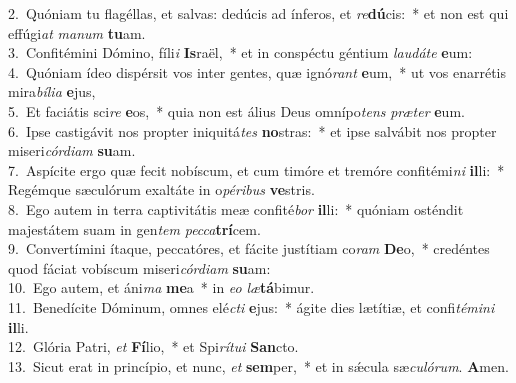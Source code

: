 {2.~}Quóniam tu flagéllas, et salvas: dedúcis ad ínferos, et \textit{re}\textbf{dú}cis:~* et non est qui effúgi\textit{at} \textit{ma}\textit{num} \textbf{tu}am.\\
{3.~}Confitémini Dómino, fíli\textit{i} \textbf{Is}raël,~* et in conspéctu géntium \textit{lau}\textit{dá}\textit{te} \textbf{e}um:\\
{4.~}Quóniam ídeo dispérsit vos inter gentes, quæ ignó\textit{rant} \textbf{e}um,~* ut vos enarrétis mira\textit{bí}\textit{li}\textit{a} \textbf{e}jus,\\
{5.~}Et faciátis sci\textit{re} \textbf{e}os,~* quia non est álius Deus omnípo\textit{tens} \textit{præ}\textit{ter} \textbf{e}um.\\
{6.~}Ipse castigávit nos propter iniquitá\textit{tes} \textbf{no}stras:~* et ipse salvábit nos propter miseri\textit{cór}\textit{di}\textit{am} \textbf{su}am.\\
{7.~}Aspícite ergo quæ fecit nobíscum, et cum timóre et tremóre confitémi\textit{ni} \textbf{il}li:~* Regémque sæculórum exaltáte in o\textit{pé}\textit{ri}\textit{bus} \textbf{ve}stris.\\
{8.~}Ego autem in terra captivitátis meæ confité\textit{bor} \textbf{il}li:~* quóniam osténdit majestátem suam in gen\textit{tem} \textit{pec}\textit{ca}\textbf{trí}cem.\\
{9.~}Convertímini ítaque, peccatóres, et fácite justítiam co\textit{ram} \textbf{De}o,~* credéntes quod fáciat vobíscum miseri\textit{cór}\textit{di}\textit{am} \textbf{su}am:\\
{10.~}Ego autem, et áni\textit{ma} \textbf{me}a~* in \textit{e}\textit{o} \textit{læ}\textbf{tá}bimur.\\
{11.~}Benedícite Dóminum, omnes elé\textit{cti} \textbf{e}jus:~* ágite dies lætítiæ, et confi\textit{té}\textit{mi}\textit{ni} \textbf{il}li.\\
{12.~}Glória Patri, \textit{et} \textbf{Fí}lio,~* et Spi\textit{rí}\textit{tu}\textit{i} \textbf{San}cto.\\
{13.~}Sicut erat in princípio, et nunc, \textit{et} \textbf{sem}per,~* et in sǽcula sæ\textit{cu}\textit{ló}\textit{rum}. \textbf{A}men.\\
